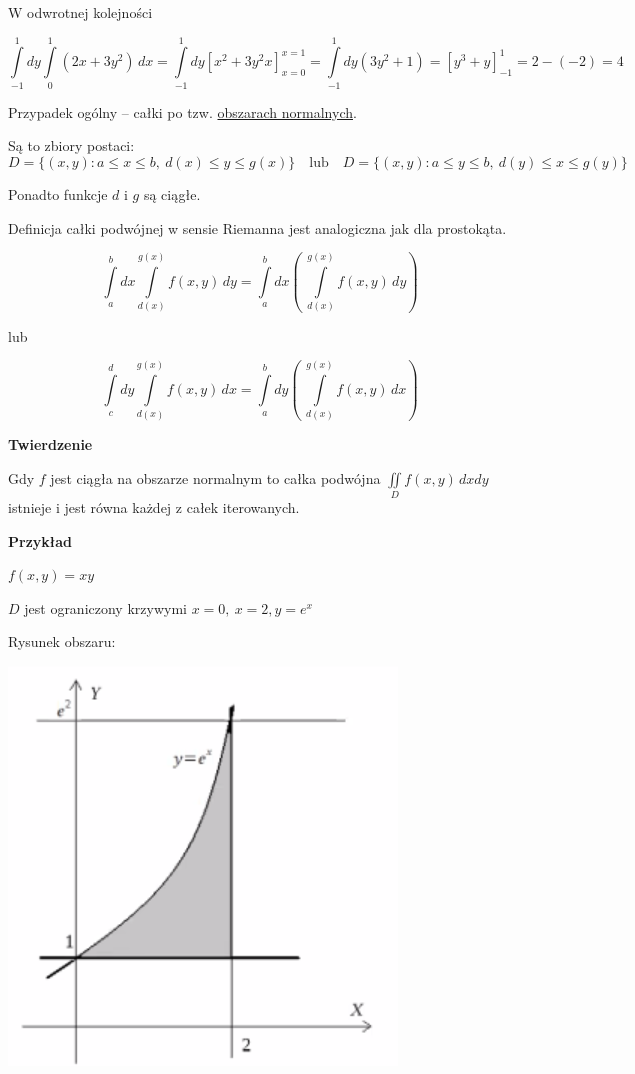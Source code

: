 \begin{center} W odwrotnej kolejności \end{center}
\[ \int\limits_{-1}^{1} dy \int\limits_{0}^{1} (2x+3y^2)\, dx = \int\limits_{-1}^{1} dy \left[ x^2 + 3y^2x \right]_{x=0}^{x=1} 
= \int\limits_{-1}^{1} dy (3y^2 + 1) = \left[ y^3 + y \right]_{-1}^{1} = 2- (-2) = 4 \]

Przypadek ogólny -- całki po tzw. \underline{obszarach normalnych}.

Są to zbiory postaci:
\[ D = \{ (x,y): a \leq x \leq b, \ d(x) \leq y \leq g(x) \} \quad \textrm{lub} \quad D = \{ (x,y): a \leq y \leq b, \ d(y) \leq x \leq g(y) \} \]

Ponadto funkcje $d$ i $g$ są ciągłe.
\bigskip

Definicja całki podwójnej w sensie Riemanna jest analogiczna jak dla prostokąta.

\[ \int\limits_{a}^{b} dx \int\limits_{d(x)}^{g(x)} f(x,y)\, dy = \int\limits_{a}^{b} dx \left( \ \int\limits_{d(x)}^{g(x)} f(x,y)\, dy \right) \]
\begin{center} lub \end{center}
\[ \int\limits_{c}^{d} dy \int\limits_{d(x)}^{g(x)} f(x,y)\, dx = \int\limits_{a}^{b} dy \left( \ \int\limits_{d(x)}^{g(x)} f(x,y)\, dx \right) \]

\textbf{Twierdzenie}

Gdy $f$ jest ciągła na obszarze normalnym to całka podwójna $ \iint\limits_{D} f(x,y)\, dxdy $ istnieje i jest równa każdej z całek iterowanych. 
\bigskip

\textbf{Przykład}

$ f(x,y) = xy $

$D$ jest ograniczony krzywymi $ x=0, \ x=2, y=e^x $
\medskip

\begin{center}
    Rysunek obszaru:
    
    \includegraphics[scale=0.7]{img/krzywetrojkat.png}
\end{center}

